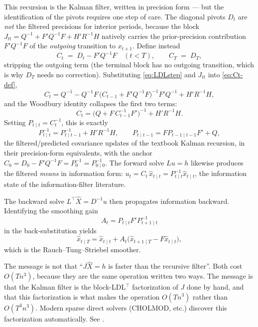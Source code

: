 \documentclass[11pt]{article}
\begin{document}
This recursion is the Kalman filter, written in precision form --- but
the identification of the pivots requires one step of care.  The
diagonal pivots $D_t$ are \emph{not} the filtered precisions for
interior periods, because the block $J_{tt}=Q^{-1}+F'Q^{-1}F+H'R^{-1}H$
natively carries the prior-precision contribution $F'Q^{-1}F$ of the
\emph{outgoing} transition to $x_{t+1}$.  Define instead
\begin{equation}
C_t \;=\; D_t-F'Q^{-1}F \quad (t<T),
\qquad
C_T \;=\; D_T,
\label{eq:Ct-def}
\end{equation}
stripping the outgoing term (the terminal block has no outgoing
transition, which is why $D_T$ needs no correction).  Substituting
\eqref{eq:LDLstep} and $J_{tt}$ into \eqref{eq:Ct-def},
\begin{equation}
C_t
= Q^{-1}-Q^{-1}F\,\bigl(C_{t-1}+F'Q^{-1}F\bigr)^{-1}F'Q^{-1}
  + H'R^{-1}H,
\end{equation}
and the Woodbury identity collapses the first two terms:
\begin{equation}
C_t=\bigl(Q+F\,C_{t-1}^{-1}F'\bigr)^{-1}+H'R^{-1}H .
\end{equation}
Setting $P_{t\mid t}=C_t^{-1}$, this is exactly
\begin{equation}
P_{t\mid t}^{-1}=P_{t\mid t-1}^{-1}+H'R^{-1}H,
\qquad
P_{t\mid t-1}=FP_{t-1\mid t-1}F'+Q,
\end{equation}
the filtered/predicted covariance updates of the textbook Kalman
recursion, in their precision-form equivalents, with the anchor
$C_0=D_0-F'Q^{-1}F=P_0^{-1}=P_{0\mid 0}^{-1}$.  The forward solve
$Lu=h$ likewise produces the filtered \emph{means} in information
form: $u_t=C_t\,\widehat x_{t\mid t}=P_{t\mid t}^{-1}\widehat x_{t\mid t}$,
the information state of the information-filter literature.

The backward solve $L^\top \widehat X=D^{-1}u$ then propagates information
backward.  Identifying the smoothing gain
\begin{equation}
A_t=P_{t\mid t}F' P_{t+1\mid t}^{-1}
\end{equation}
in the back-substitution yields
\begin{equation}
\widehat x_{t\mid T}=\widehat x_{t\mid t}+A_t\bigl(\widehat x_{t+1\mid T}-F\widehat x_{t\mid t}\bigr),
\end{equation}
which is the Rauch--Tung--Striebel smoother.

The message is not that ``$J\widehat X=h$ is faster than the recursive
filter''.  Both cost $O(Tn^3)$, because they are the same operation
written two ways.  The message is that the Kalman filter is the
block-LDL$^\top$ factorization of $J$ done by hand, and that this
factorization is what makes the operation $O(Tn^3)$ rather than
$O(T^3n^3)$.  Modern sparse direct solvers (CHOLMOD, etc.) discover
this factorization automatically.  See \citet{Davis2006}.
\end{document}
